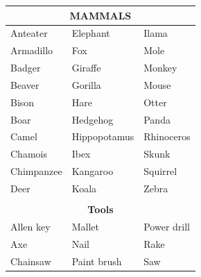 \begin{table}[t]
\centering

\begin{tabular}{lll}
\hline
\multicolumn{3}{|c|}{\textbf{MAMMALS}}                                                 \\ \hline
\multicolumn{1}{|l|}{Anteater}      & \multicolumn{1}{l|}{Elephant}       & \multicolumn{1}{l|}{Ilama}       \\ \hline
\multicolumn{1}{|l|}{Armadillo}     & \multicolumn{1}{l|}{Fox}            & \multicolumn{1}{l|}{Mole}        \\ \hline
\multicolumn{1}{|l|}{Badger}        & \multicolumn{1}{l|}{Giraffe}        & \multicolumn{1}{l|}{Monkey}      \\ \hline
\multicolumn{1}{|l|}{Beaver}        & \multicolumn{1}{l|}{Gorilla}        & \multicolumn{1}{l|}{Mouse}       \\ \hline
\multicolumn{1}{|l|}{Bison}         & \multicolumn{1}{l|}{Hare}           & \multicolumn{1}{l|}{Otter}       \\ \hline
\multicolumn{1}{|l|}{Boar}          & \multicolumn{1}{l|}{Hedgehog}       & \multicolumn{1}{l|}{Panda}       \\ \hline
\multicolumn{1}{|l|}{Camel}         & \multicolumn{1}{l|}{Hippopotamus}   & \multicolumn{1}{l|}{Rhinoceros}  \\ \hline
\multicolumn{1}{|l|}{Chamois}       & \multicolumn{1}{l|}{Ibex}           & \multicolumn{1}{l|}{Skunk}       \\ \hline
\multicolumn{1}{|l|}{Chimpanzee}    & \multicolumn{1}{l|}{Kangaroo}       & \multicolumn{1}{l|}{Squirrel}    \\ \hline
\multicolumn{1}{|l|}{Deer}          & \multicolumn{1}{l|}{Koala}          & \multicolumn{1}{l|}{Zebra}       \\ \hline
                                    &                                     &                                  \\ \hline
\multicolumn{3}{|c|}{\textbf{Tools}}                                                 \\ \hline
\multicolumn{1}{|l|}{Allen key}     & \multicolumn{1}{l|}{Mallet}         & \multicolumn{1}{l|}{Power drill} \\ \hline
\multicolumn{1}{|l|}{Axe}           & \multicolumn{1}{l|}{Nail}           & \multicolumn{1}{l|}{Rake}        \\ \hline
\multicolumn{1}{|l|}{Chainsaw}      & \multicolumn{1}{l|}{Paint brush}    & \multicolumn{1}{l|}{Saw}         \\ \hline

\end{tabular}
\end{table}
